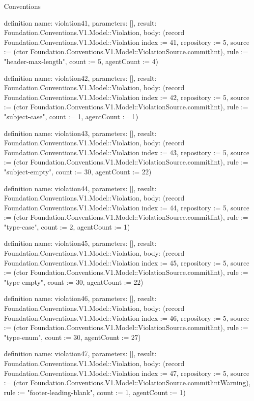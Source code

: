 \begin{lexlean}{Conventions}
\begin{semanticmodule}
definition{
  name: violation41,
  parameters: [],
  result: Foundation.Conventions.V1.Model::Violation,
  body: (record Foundation.Conventions.V1.Model::Violation {index := 41, repository := 5, source := (ctor Foundation.Conventions.V1.Model::ViolationSource.commitlint), rule := "header-max-length", count := 5, agentCount := 4})
}

definition{
  name: violation42,
  parameters: [],
  result: Foundation.Conventions.V1.Model::Violation,
  body: (record Foundation.Conventions.V1.Model::Violation {index := 42, repository := 5, source := (ctor Foundation.Conventions.V1.Model::ViolationSource.commitlint), rule := "subject-case", count := 1, agentCount := 1})
}

definition{
  name: violation43,
  parameters: [],
  result: Foundation.Conventions.V1.Model::Violation,
  body: (record Foundation.Conventions.V1.Model::Violation {index := 43, repository := 5, source := (ctor Foundation.Conventions.V1.Model::ViolationSource.commitlint), rule := "subject-empty", count := 30, agentCount := 22})
}

definition{
  name: violation44,
  parameters: [],
  result: Foundation.Conventions.V1.Model::Violation,
  body: (record Foundation.Conventions.V1.Model::Violation {index := 44, repository := 5, source := (ctor Foundation.Conventions.V1.Model::ViolationSource.commitlint), rule := "type-case", count := 2, agentCount := 1})
}

definition{
  name: violation45,
  parameters: [],
  result: Foundation.Conventions.V1.Model::Violation,
  body: (record Foundation.Conventions.V1.Model::Violation {index := 45, repository := 5, source := (ctor Foundation.Conventions.V1.Model::ViolationSource.commitlint), rule := "type-empty", count := 30, agentCount := 22})
}

definition{
  name: violation46,
  parameters: [],
  result: Foundation.Conventions.V1.Model::Violation,
  body: (record Foundation.Conventions.V1.Model::Violation {index := 46, repository := 5, source := (ctor Foundation.Conventions.V1.Model::ViolationSource.commitlint), rule := "type-enum", count := 30, agentCount := 27})
}

definition{
  name: violation47,
  parameters: [],
  result: Foundation.Conventions.V1.Model::Violation,
  body: (record Foundation.Conventions.V1.Model::Violation {index := 47, repository := 5, source := (ctor Foundation.Conventions.V1.Model::ViolationSource.commitlintWarning), rule := "footer-leading-blank", count := 1, agentCount := 1})
}


\end{semanticmodule}
\end{lexlean}
